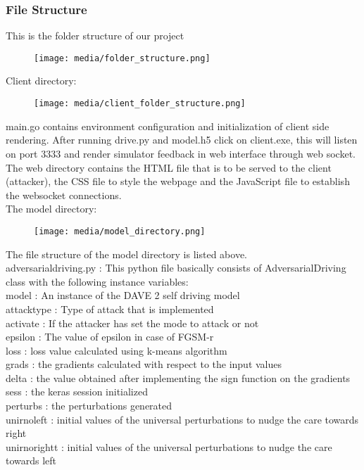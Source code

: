 \documentclass[ 12pt,a4paper,twocolumn,fleqn]{article}
\begin{document}
\subsubsection{File Structure}
This is the folder structure of our project
\begin{figure}[H]
\texttt{[image: media/folder\_structure.png]}
\centering
\end{figure}
Client directory:
\begin{figure}[H]
\texttt{[image: media/client\_folder\_structure.png]}
\centering
\end{figure}
main.go contains environment configuration and initialization of client side rendering.
After running drive.py and model.h5 click on client.exe, this will listen on port 3333 and render simulator feedback in web interface through web socket. 
The web directory contains the HTML file that is to be served to the client (attacker), the CSS file to style the webpage and the JavaScript file to establish the websocket connections.\\
The model directory:
\begin{figure}[H]
\texttt{[image: media/model\_directory.png]}
\centering
\end{figure}
The file structure of the model directory is listed above. \\
adversarialdriving.py :
This python file basically consists of AdversarialDriving class with the following instance variables:\\
model : An instance of the DAVE 2 self driving model\\
attacktype : Type of attack that is implemented\\
activate : If the attacker has set the mode to attack or not\\
epsilon : The value of epsilon in case of FGSM-r\\
loss : loss value calculated using k-means algorithm\\
grads : the gradients calculated with respect to the input values\\
delta : the value obtained after implementing the sign function on the gradients\\
sess : the keras session initialized\\
perturbs : the perturbations generated\\
unirnoleft : initial values of the universal perturbations to nudge the care towards right\\
unirnorightt : initial values of the universal perturbations to nudge the care towards left\\
\end{document}
